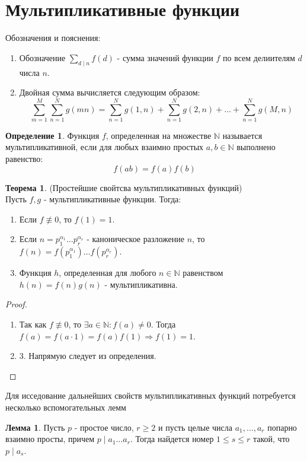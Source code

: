 \documentclass[a4paper, 12pt]{article}
\newcommand{\N}{\mathbb{N}}
\renewcommand{\div}{\mid}
\theoremstyle{definition}
\newtheorem{definition}{Определение}[section]
\newtheorem{theorem}{Теорема}[section]
\newtheorem{lemma}{Лемма}[section]
\begin{document}
    \section{Мультипликативные функции}
    Обозначения и пояснения:
    \begin{enumerate}
        \item Обозначение $\sum\limits_{d\div n}f(d)$ - сумма значений функции $f$ по всем делиителям $d$ числа $n$.
        \item Двойная сумма вычисляется следующим образом: \[\sum\limits_{m=1}^M\sum\limits_{n=1}^Ng(mn)=\sum\limits_{n=1}^Ng(1,n)+\sum\limits_{n=1}^Ng(2,n)+\dots +\sum\limits_{n=1}^Ng(M,n)\]
    \end{enumerate}
    \begin{definition}
        Функция $f$, определенная на множестве $\N$ называется мультипликативной, если для любых взаимно простых $a,b\in \N$ выполнено равенство:
        $$f(ab)=f(a)f(b)$$
    \end{definition}
    \begin{theorem}(Простейшие свойтсва мультипликативных функций) \label{th6.1}\\
        Пусть $f,g$ - мультипликативные функции. Тогда:
        \begin{enumerate}
            \item Если $f\not\equiv 0$, то $f(1)=1$.
            \item Если $n=p_1^{\alpha_1}\dots p_r^{\alpha_r}$ - каноническое разложение $n$, то $f(n)=f(p_1^{\alpha_1})\dots f(p_r^{\alpha_r})$.
            \item Функция $h$, определенная для любого $n\in \N$ равенством\\ $h(n)=f(n)g(n)$ - мультипликативна. 
        \end{enumerate}
        \begin{proof}
            \begin{enumerate}
            \item Так как $f\not\equiv 0$, то $\exists a\in \N: f(a)\ne 0$. Тогда\\ $f(a)=f(a\cdot 1)=f(a)f(1) \Rightarrow f(1)=1$.
            \item 3. Напрямую следует из определения.
            \end{enumerate}
        \end{proof}
    \end{theorem}
    Для исседование дальнейших свойств мультипликативных функций потребуется несколько вспомогательных лемм
    \begin{lemma} \label{lemma6.1}
        Пусть $p$ - простое число, $r\geq 2$ и пусть целые числа $a_1,\dots, a_r$ попарно взаимно просты, причем $p \div a_1\dots a_r$. Тогда найдется номер $1\leq s\leq r$ такой, что $p\div a_s$.
    \end{lemma} 
\end{document}
